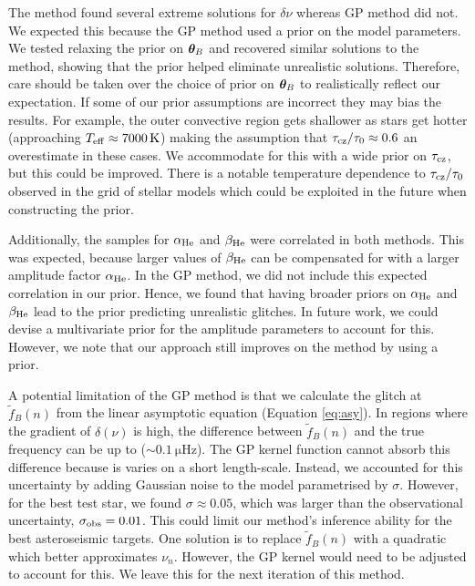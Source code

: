 
The  method found several extreme solutions for \(\delta\nu\) whereas GP method did not. We expected this because the GP method used a prior on the model parameters. We tested relaxing the prior on \(\bm{\theta}_B\) and recovered similar solutions to the  method, showing that the prior helped eliminate unrealistic solutions. Therefore, care should be taken over the choice of prior on \(\bm{\theta}_B\) to realistically reflect our expectation. If some of our prior assumptions are incorrect they may bias the results. For example, the outer convective region gets shallower as stars get hotter (approaching \({T_\mathrm{eff}} \approx \SI{7000}{\kelvin}\)) making the assumption that \(\tau_{{\mathrm{cz}}}/\tau_0 \approx 0.6\) an overestimate in these cases. We accommodate for this with a wide prior on \(\tau_{{\mathrm{cz}}}\), but this could be improved. There is a notable temperature dependence to \(\tau_{{\mathrm{cz}}}/\tau_0\) observed in the grid of stellar models which could be exploited in the future when constructing the prior.

Additionally, the samples for \(\alpha_{{\mathrm{He}}}\) and \(\beta_{{\mathrm{He}}}\) were correlated in both methods. This was expected, because larger values of \(\beta_{{\mathrm{He}}}\) can be compensated for with a larger amplitude factor \(\alpha_{{\mathrm{He}}}\). In the GP method, we did not include this expected correlation in our prior. Hence, we found that having broader priors on \(\alpha_{{\mathrm{He}}}\) and \(\beta_{{\mathrm{He}}}\) lead to the prior predicting unrealistic glitches. In future work, we could devise a multivariate prior for the amplitude parameters to account for this. However, we note that our approach still improves on the  method by using a prior.

A potential limitation of the GP method is that we calculate the glitch at \(\tilde{f}_B(n)\) from the linear asymptotic equation (Equation \ref{eq:asy}). In regions where the gradient of \(\delta(\nu)\) is high, the difference between \(\tilde{f}_B(n)\) and the true frequency can be up to (\(\sim \SI{0.1}{\micro\hertz}\)). The GP kernel function cannot absorb this difference because is varies on a short length-scale. Instead, we accounted for this uncertainty by adding Gaussian noise to the model parametrised by \(\sigma\). However, for the best test star, we found \(\sigma \approx 0.05\), which was larger than the observational uncertainty, \(\sigma_{{\mathrm{obs}}} = 0.01\). This could limit our method's inference ability for the best asteroseismic targets. One solution is to replace \(\tilde{f}_B(n)\) with a quadratic \citep[e.g.][]{Nielsen.Davies.ea2021} which better approximates \(\nu_n\). However, the GP kernel would need to be adjusted to account for this. We leave this for the next iteration of this method.

